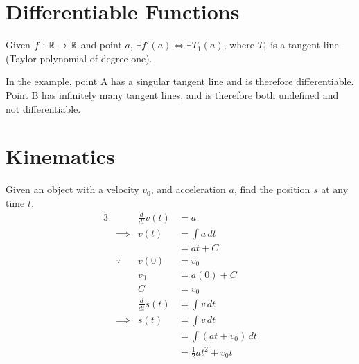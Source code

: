 \documentclass[twoside]{report}
\begin{document}
    \section{Differentiable Functions}
    \begin{definition}[Differentiability]
        Given $f: \mathbb{R} \to \mathbb{R}$ and point $a$, $\exists f'(a) \iff \exists T_{1}(a)$, where $T_1$ is a tangent line (Taylor polynomial of degree one).
        \begin{center}
        \end{center}
        In the example, point A has a singular tangent line and is therefore differentiable. Point B has infinitely many tangent lines, and is therefore both undefined and not differentiable.
    \end{definition}
    \np
    \section{Kinematics}
    \begin{example}
        Given an object with a velocity $v_0$, and acceleration $a$, find the position $s$ at any time $t$.
        \begin{alignat}{3}
            &&\frac{d}{dt}v(t) &= a\\
            &\implies &v(t) &= \int a\,dt\\
            &&&= at + C\\
            &\because & v(0) &= v_{0}\\
            &&v_{0} &= a(0) + C\\
            &&C &= v_{0}\\
            &&\frac{d}{dt}s(t) &= \int v\,dt\\
            &\implies& s(t) &= \int v\,dt\\
            &&&= \int (at + v_{0})\,dt\\
            &&&= \frac{1}{2}a t^{2} + v_{0}t
        \end{alignat}
    \end{example}
\end{document}
